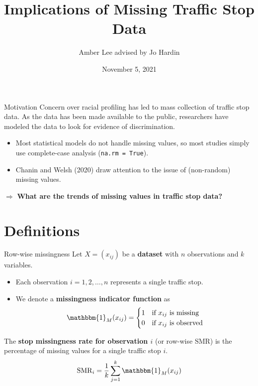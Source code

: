 \documentclass[11pt]{beamer}
\title[Implications of Missing Traffic Stop Data]{Implications of Missing Traffic Stop Data}
\author{Amber Lee advised by Jo Hardin}
\institute[]{Pomona College}
\date{November 5, 2021}
\newcommand{\indic}{\mathbbm{1}_M}
\newcommand{\SMR}{\mathrm{SMR}}
\begin{document}

\maketitle


\begin{frame}{Motivation}
    Concern over racial profiling has led to mass collection of traffic stop data. As the data has been made available to the public, researchers have modeled the data to look for evidence of discrimination. \pause
    \begin{itemize}
    \item Most statistical models do not handle missing values, so most studies simply use complete-case analysis (\texttt{na.rm = True}).
    \item Chanin and Welsh (2020) draw attention to the issue of (non-random) missing values.
    \end{itemize} \pause
    $\Rightarrow$ {\bf{What are the trends of missing values in traffic stop data?}}
\end{frame}

\section{Definitions}

\begin{frame}{Row-wise missingness} %
    Let $X = (x_{ij})$ be a {\bf{dataset}} with $n$ observations and $k$ variables. 
    \begin{itemize}
    \item Each observation $i = 1, 2, \ldots, n$ represents a single traffic stop. 
    \item We denote a {\bf{missingness indicator function}} as
    \begin{equation*}
    \indic(x_{ij}) =
    \begin{cases}
    1 & \text{if $x_{ij}$ is missing} \\
    0 & \text{if $x_{ij}$ is observed}
    \end{cases}
    \end{equation*}
    \end{itemize} \pause
    \begin{definition}
    The {\bf{stop missingness rate for observation $i$}} (or row-wise $\SMR$) is the percentage of missing values for a single traffic stop $i$. 
    \begin{equation*}
    \SMR_i = \dfrac{1}{k} \sum_{j = 1}^{k} \indic(x_{ij})
    \end{equation*}
    \end{definition}
\end{frame}
\end{document}
